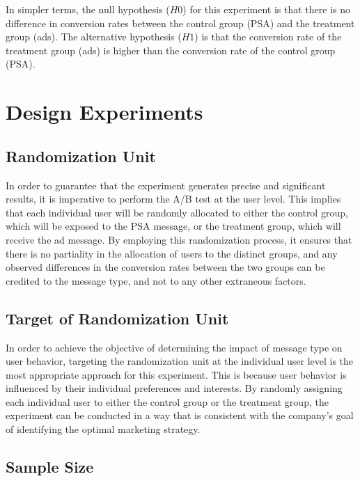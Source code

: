 \documentclass{article}
\begin{document}
In simpler terms, the null hypothesis ($H 0$) for this experiment is that there is no difference in conversion rates between the control group (PSA) and the treatment group (ads). The alternative hypothesis ($H 1$) is that the conversion rate of the treatment group (ads) is higher than the conversion rate of the control group (PSA). \par
\section{Design Experiments} \par

\subsection*{Randomization Unit} \par
In order to guarantee that the experiment generates precise and significant results, it is imperative to perform the A/B test at the user level. This implies that each individual user will be randomly allocated to either the control group, which will be exposed to the PSA message, or the treatment group, which will receive the ad message. By employing this randomization process, it ensures that there is no partiality in the allocation of users to the distinct groups, and any observed differences in the conversion rates between the two groups can be credited to the message type, and not to any other extraneous factors. \par

\subsection*{Target of Randomization Unit} \par

In order to achieve the objective of determining the impact of message type on user behavior, targeting the randomization unit at the individual user level is the most appropriate approach for this experiment. This is because user behavior is influenced by their individual preferences and interests. By randomly assigning each individual user to either the control group or the treatment group, the experiment can be conducted in a way that is consistent with the company's goal of identifying the optimal marketing strategy. \par

\subsection*{Sample Size} \par
\end{document}
